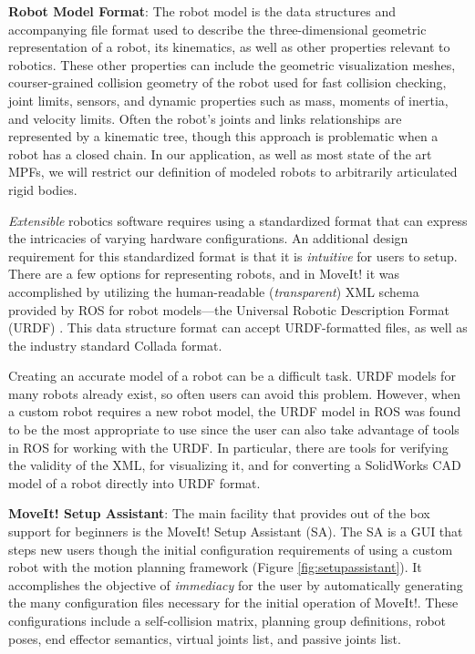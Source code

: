 \documentclass[10pt,journal,compsoc]{joser1}
\begin{document}
{{\bf Robot Model Format}: The robot model is the data structures and
accompanying file format used to describe the three-dimensional geometric
representation of a robot, its kinematics, as well as other properties relevant
to robotics. These other properties can include the geometric visualization
meshes, courser-grained collision geometry of the robot used for fast collision
checking, joint limits, sensors, and dynamic properties such as mass, moments of
inertia, and velocity limits. Often the robot's joints and links relationships
are represented by a kinematic tree, though this approach is problematic when a
robot has a closed chain. In our application, as well as most state of the art
MPFs, we will restrict our definition of modeled robots to arbitrarily
articulated rigid bodies. 

\textit{Extensible} robotics software requires using a standardized format that
can express the intricacies of varying hardware configurations. An additional
design requirement for this standardized format is that it is \textit{intuitive}
for users to setup. There are a few options for representing robots, and in
MoveIt! it was accomplished by utilizing the human-readable
(\textit{transparent}) XML schema provided by ROS for robot models---the
Universal Robotic Description Format (URDF) \cite{urdf}. This data structure
format can accept URDF-formatted files, as well as the industry standard Collada
\cite{collada} format. 

Creating an accurate model of a robot can be a difficult task. URDF models for
many robots already exist, so often users can avoid this problem. However, when
a custom robot requires a new robot model, the URDF model in ROS was found to be
the most appropriate to use since the user can also take advantage of tools in
ROS for working with the URDF. In particular, there are tools for verifying the
validity of the XML, for visualizing it, and for converting a SolidWorks CAD
model of a robot directly into URDF format. 

{\bf MoveIt! Setup Assistant}: The main facility that provides out of the box
support for beginners is the MoveIt! Setup Assistant (SA). The SA is a GUI that
steps new users though the initial configuration requirements of using a custom
robot with the motion planning framework (Figure \ref{fig:setupassistant}). It
accomplishes the objective of \textit{immediacy} for the user by automatically
generating the many configuration files necessary for the initial operation of
MoveIt!. These configurations include a self-collision matrix, planning group
definitions, robot poses, end effector semantics, virtual joints list, and
passive joints list. 

}
\end{document}
